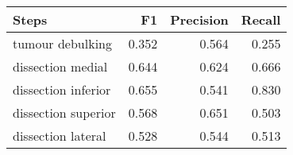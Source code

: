 \begin{tabular}{lrrr}
\toprule
Steps & F1 & Precision & Recall \\
\midrule
tumour debulking & 0.352 & 0.564 & 0.255 \\
dissection medial & 0.644 & 0.624 & 0.666 \\
dissection inferior & 0.655 & 0.541 & 0.830 \\
dissection superior & 0.568 & 0.651 & 0.503 \\
dissection lateral & 0.528 & 0.544 & 0.513 \\
\bottomrule
\end{tabular}
